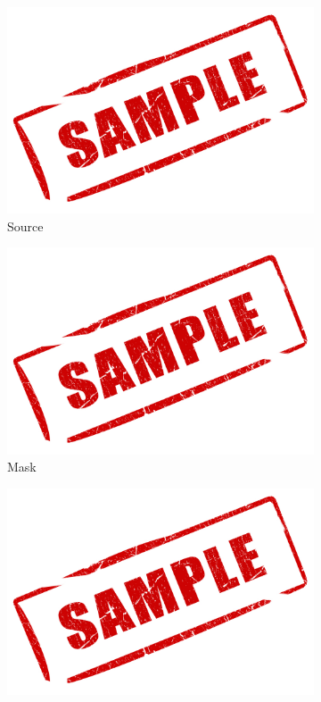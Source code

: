 \documentclass[paper=a4, fontsize=12pt]{scrartcl} %
\numberwithin{equation}{section}       %
\numberwithin{figure}{section}         %
\numberwithin{table}{section}          %
\begin{document}
\begin{figure}[H]
    \centering
    \begin{subfigure}[b]{0.40\textwidth}
        \includegraphics[width=\textwidth]{sample}
        \caption{ Source}
    \end{subfigure}
        \begin{subfigure}[b]{0.40\textwidth}
        \includegraphics[width=\textwidth]{sample}
        \caption{ Mask}
    \end{subfigure}
    \begin{subfigure}[b]{0.40\textwidth}
        \includegraphics[width=\textwidth]{sample}

\end{subfigure}
\end{figure}
\end{document}
